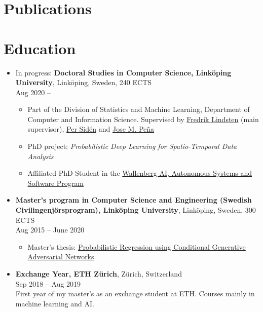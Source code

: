\documentclass[12pt]{article}
\begin{document}
\section*{Publications}
\nocite{*}


\section*{Education}
\begin{itemize}
    \item In progress: \textbf{Doctoral Studies in Computer Science, Linköping University}, Linköping, Sweden, 240 ECTS\\
        Aug 2020 --
            \begin{itemize}
                \item Part of the Division of Statistics and Machine Learning, Department of Computer and Information Science. Supervised by \href{https://lindsten.netlify.app/}{Fredrik Lindsten} (main supervisor), \href{https://scholar.google.se/citations?user=0UomzRIAAAAJ}{Per Sidén} and \href{https://www.ida.liu.se/~jospe50/}{Jose M. Peña}
                \item PhD project: \textit{Probabilistic Deep Learning for Spatio-Temporal Data Analysis}
                \item Affiliated PhD Student in the \href{https://wasp-sweden.org/}{Wallenberg AI, Autonomous Systems and Software Program}
            \end{itemize}
        \item
            \textbf{Master's program in Computer Science and Engineering (Swedish Civilingenjörsprogram), Linköping University}, Linköping, Sweden, 300 ECTS\\
        Aug 2015 -- June 2020
        \begin{itemize}
            \item Master's thesis: \href{http://urn.kb.se/resolve?urn=urn:nbn:se:liu:diva-166637}{Probabilistic Regression using Conditional Generative Adversarial Networks}
        \end{itemize}

    \item \textbf{Exchange Year, ETH Zürich}, Zürich, Switzerland\\
        Sep 2018 -- Aug 2019\\
            First year of my master's as an exchange student at ETH. Courses mainly in machine learning and AI.
\end{itemize}
\end{document}
